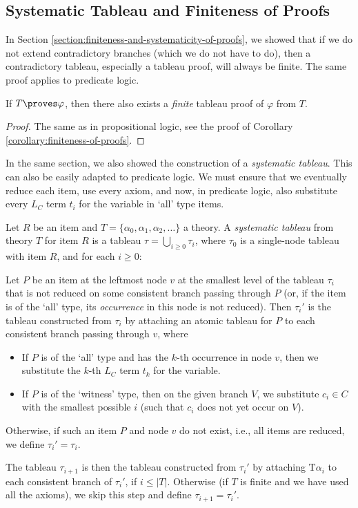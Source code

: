 \subsection{Systematic Tableau and Finiteness of Proofs}

In Section \ref{section:finiteness-and-systematicity-of-proofs}, we showed that if we do not extend contradictory branches (which we do not have to do), then a contradictory tableau, especially a tableau proof, will always be finite. The same proof applies to predicate logic.

\begin{corollary}\label{corollary:finiteness-of-proofs-predicate}
    If $T\proves\varphi$, then there also exists a \emph{finite} tableau proof of $\varphi$ from $T$.
\end{corollary}
\begin{proof}
The same as in propositional logic, see the proof of Corollary \ref{corollary:finiteness-of-proofs}.
\end{proof}

In the same section, we also showed the construction of a \emph{systematic tableau}. This can also be easily adapted to predicate logic. We must ensure that we eventually reduce each item, use every axiom, and now, in predicate logic, also substitute every $L_C$ term $t_i$ for the variable in `all' type items.

\begin{definition}
Let $R$ be an item and $T=\{\alpha_0,\alpha_1,\alpha_2,\dots\}$ a theory. A \emph{systematic tableau} from theory $T$ for item $R$ is a tableau $\tau=\bigcup_{i\geq 0}\tau_i$, where $\tau_0$ is a single-node tableau with item $R$, and for each $i\geq 0$:

Let $P$ be an item at the leftmost node $v$ at the smallest level of the tableau $\tau_i$ that is not reduced on some consistent branch passing through $P$ (or, if the item is of the `all' type, its \emph{occurrence} in this node is not reduced). Then $\tau_i'$ is the tableau constructed from $\tau_i$ by attaching an atomic tableau for $P$ to each consistent branch passing through $v$, where
\begin{itemize}
    \item If $P$ is of the `all' type and has the $k$-th occurrence in node $v$, then we substitute the $k$-th $L_C$ term $t_k$ for the variable.
    \item If $P$ is of the `witness' type, then on the given branch $V$, we substitute $c_i\in C$ with the smallest possible $i$ (such that $c_i$ does not yet occur on $V$).
\end{itemize}
Otherwise, if such an item $P$ and node $v$ do not exist, i.e., all items are reduced, we define $\tau_i'=\tau_i$.

The tableau $\tau_{i+1}$ is then the tableau constructed from $\tau_i'$ by attaching $\mathrm{T}\alpha_i$ to each consistent branch of $\tau_i'$, if $i\leq |T|$. Otherwise (if $T$ is finite and we have used all the axioms), we skip this step and define $\tau_{i+1}=\tau_i'$. 
\end{definition}

